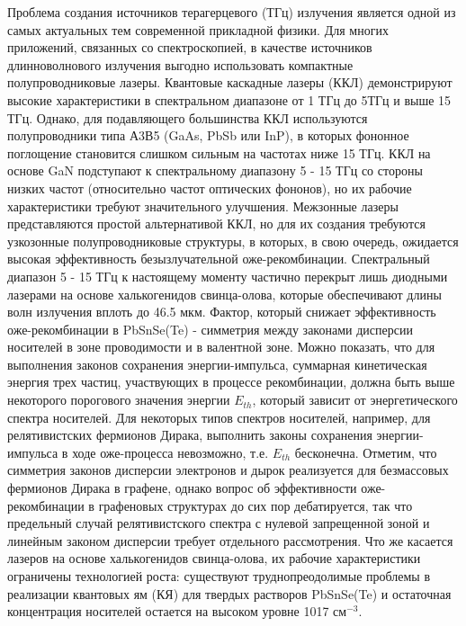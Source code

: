 Проблема создания источников терагерцевого (ТГц) излучения 
является одной из самых актуальных тем современной прикладной 
физики. Для многих приложений, связанных со спектроскопией, в 
качестве источников длинноволнового излучения выгодно использовать 
компактные полупроводниковые лазеры. Квантовые каскадные лазеры (ККЛ) 
демонстрируют высокие характеристики в спектральном диапазоне от 1 ТГц 
до 5ТГц и выше 15 ТГц. Однако, для подавляющего большинства ККЛ 
используются полупроводники типа А3В5 (GaAs, PbSb или InP), в которых фононное 
поглощение становится слишком сильным на частотах ниже 15 ТГц. ККЛ на основе GaN подступают 
к спектральному диапазону 5 - 15 ТГц со стороны низких частот (относительно частот 
оптических фононов), но их рабочие характеристики требуют значительного улучшения. 
Межзонные лазеры представляются простой альтернативой ККЛ, но для их создания требуются 
узкозонные полупроводниковые структуры, в которых, в свою очередь, ожидается высокая эффективность 
безызлучательной оже-рекомбинации. Спектральный диапазон 5 - 15 ТГц к настоящему моменту частично 
перекрыт лишь диодными лазерами на основе халькогенидов свинца-олова, которые обеспечивают длины 
волн излучения вплоть до 46.5 мкм. Фактор, который снижает эффективность оже-рекомбинации в PbSnSe(Te)
 - симметрия между законами дисперсии носителей в зоне проводимости и в валентной зоне. Можно показать, 
 что для выполнения законов сохранения энергии-импульса, суммарная кинетическая энергия трех частиц, участвующих 
 в процессе рекомбинации, должна быть выше некоторого порогового значения энергии $E_{th}$, который зависит 
 от энергетического спектра носителей. Для некоторых типов спектров носителей, например, для релятивистских 
 фермионов Дирака, выполнить законы сохранения энергии-импульса в ходе оже-процесса невозможно, т.е. $E_{th}$ бесконечна. 
 Отметим, что симметрия законов дисперсии электронов и дырок реализуется для безмассовых фермионов Дирака в графене, 
 однако вопрос об эффективности оже-рекомбинации в графеновых структурах до сих пор дебатируется, так что предельный 
 случай релятивистского спектра с нулевой запрещенной зоной и линейным законом дисперсии требует отдельного рассмотрения. 
 Что же касается лазеров на основе халькогенидов свинца-олова, их рабочие характеристики ограничены технологией роста: существуют
  труднопреодолимые проблемы в реализации квантовых ям (КЯ) для твердых растворов PbSnSe(Te) и остаточная концентрация носителей
   остается на высоком уровне 1017 $\text{см}^{-3}$.

